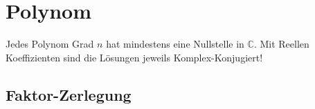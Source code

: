 \section{Polynom}
Jedes Polynom Grad $n$ hat mindestens eine Nullstelle in $\mathbb{C}$. Mit Reellen Koeffizienten sind die Lösungen jeweils Komplex-Konjugiert!

\subsection{Faktor-Zerlegung}
\todo{
\[
(z - z_0)(z-\overline{z_0}) = (z^2 - 2\Re(z_0)\cdot z + \left|z_0\right|^2)
\]
}